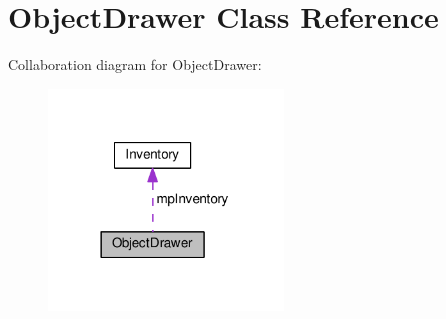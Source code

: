 \hypertarget{classObjectDrawer}{}\section{Object\+Drawer Class Reference}
\label{classObjectDrawer}


Collaboration diagram for Object\+Drawer\+:\nopagebreak
\begin{figure}[H]
\begin{center}
\leavevmode
\includegraphics[width=177pt]{classObjectDrawer__coll__graph}
\end{center}
\end{figure}
